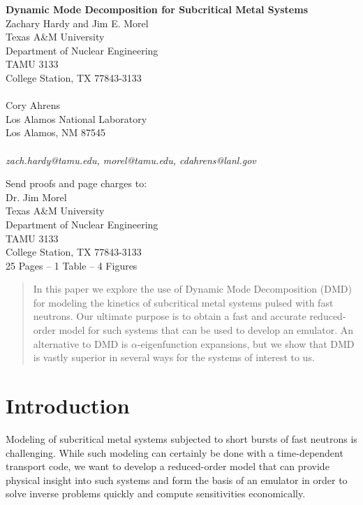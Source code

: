 \documentclass[12pt]{article}
\date{}
\newcommand{\bc}{\begin{center}}
\newcommand{\ec}{\end{center}}
\newcommand{\bss}{\singlespacing}
\newcommand{\ess}{\doublespacing}
\begin{document}
%

\thispagestyle{empty}

\bss
\bc
{\Large \bf Dynamic Mode Decomposition for Subcritical Metal Systems}\\
\vspace{0.3in}
{\large Zachary Hardy and Jim E. Morel\\
Texas A\&M University\\
Department of Nuclear Engineering\\
TAMU 3133\\
College Station, TX 77843-3133\\
$ $\\
Cory Ahrens\\
Los Alamos National Laboratory\\
Los Alamos, NM  87545\\
$ $\\
}
\emph{zach.hardy@tamu.edu, morel@tamu.edu, cdahrens@lanl.gov}

\vspace{1.5in}

Send proofs and page charges to:\\
\vspace{0.1in}
Dr. Jim Morel\\
Texas A\&M University\\
Department of Nuclear Engineering\\
TAMU 3133\\
College Station, TX 77843-3133\\
\vspace{0.25in}
25 Pages -- 1 Table -- 4 Figures \\
\ec
\ess


\newpage

\begin{abstract}
In this paper we explore the use of Dynamic Mode Decomposition (DMD) for modeling the kinetics of 
subcritical metal systems pulsed with fast neutrons.  Our ultimate purpose is to obtain a fast and 
accurate reduced-order model for such systems that can be used to develop an emulator.  
An alternative to DMD is $\alpha$-eigenfunction expansions, but we show that DMD is vastly superior in 
several ways for the systems of interest to us. 
\end{abstract}

\section{Introduction}
Modeling of subcritical metal systems subjected to short bursts of fast neutrons is challenging. 
While such modeling can certainly be done with a time-dependent transport code, we want to develop a
reduced-order model that can provide physical insight into such systems and form the basis of an emulator in 
order to solve inverse problems quickly and compute sensitivities economically. 
\end{document}
